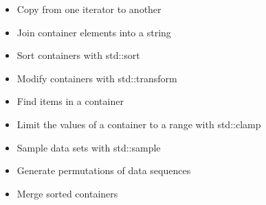 \begin{itemize}
\item 
Copy from one iterator to another

\item 
Join container elements into a string

\item 
Sort containers with std::sort

\item 
Modify containers with std::transform

\item 
Find items in a container

\item 
Limit the values of a container to a range with std::clamp

\item 
Sample data sets with std::sample

\item 
Generate permutations of data sequences

\item 
Merge sorted containers
\end{itemize}













